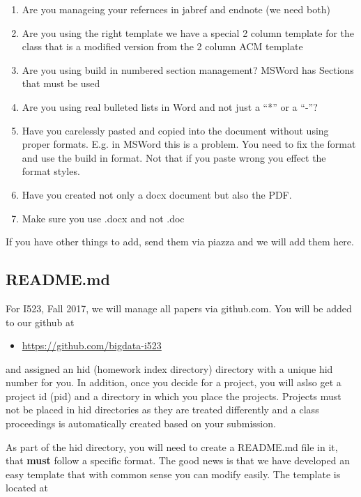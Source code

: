 \begin{enumerate}
\tightlist
\item
  Are you manageing your refernces in jabref and endnote (we need both)
\item
  Are you using the right template we have a special 2 column template
  for the class that is a modified version from the 2 column ACM
  template
\item
  Are you using build in numbered section management? MSWord has
  Sections that must be used
\item
  Are you using real bulleted lists in Word and not just a ``*'' or a
  ``-''?
\item
  Have you carelessly pasted and copied into the document without using
  proper formats. E.g. in MSWord this is a problem. You need to fix the
  format and use the build in format. Not that if you paste wrong you
  effect the format styles.
\item
  Have you created not only a docx document but also the PDF.
\item
  Make sure you use .docx and not .doc
\end{enumerate}

If you have other things to add, send them via piazza and we will add
them here.

\subsection{README.md}\label{readme.md}

For I523, Fall 2017, we will manage all papers via github.com. You will
be added to our github at

\begin{itemize}
\tightlist
\item
  \url{https://github.com/bigdata-i523}
\end{itemize}

and assigned an hid (homework index directory) directory with a unique
hid number for you. In addition, once you decide for a project, you will
aslso get a project id (pid) and a directory in which you place the
projects. Projects must not be placed in hid directories as they are
treated differently and a class proceedings is automatically created
based on your submission.

As part of the hid directory, you will need to create a README.md file
in it, that \textbf{must} follow a specific format. The good news is
that we have developed an easy template that with common sense you can
modify easily. The template is located at

